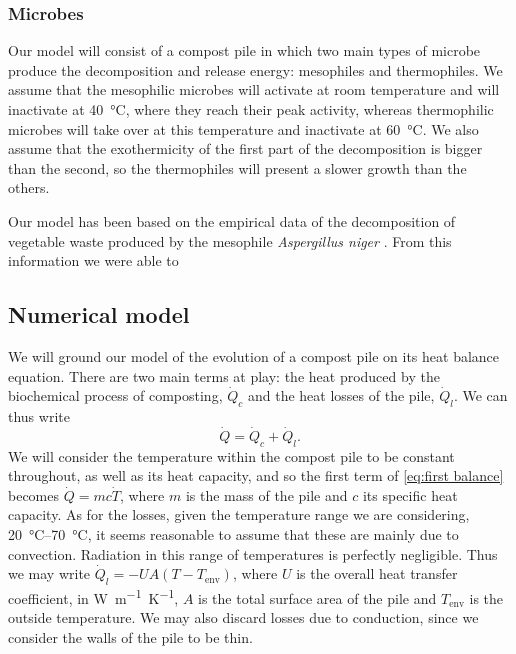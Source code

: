 \documentclass[12pt, a4paper, twocolumn, twoside]{article}
\numberwithin{table}{section}
\numberwithin{figure}{section}
\numberwithin{equation}{section}
\begin{document}
\subsubsection{Microbes}

Our model will consist of a compost pile in which two main types of microbe produce the decomposition and release energy: mesophiles and thermophiles. We assume that the mesophilic microbes will activate at room temperature and will inactivate at \SI{40}{\celsius}, where they reach their peak activity, whereas thermophilic microbes will take over at this temperature and inactivate at \SI{60}{\celsius}. We also assume that the exothermicity of the first part of the decomposition is bigger than the second, so the thermophiles will present a slower growth than the others.

Our model has been based on the empirical data of the decomposition of vegetable waste produced by the mesophile \textit{Aspergillus niger} \cite{saucedo}. From this information we were able to 

\subsection{Numerical model}
We will ground our model of the evolution of a compost pile on its heat balance equation. There are two main terms at play: the heat produced by the biochemical process of composting, \( \dot{Q}_c \) and the heat losses of the pile, \( \dot{Q}_l \). We can thus write
\begin{equation} \label{eq:first balance}
	\dot{Q} = \dot{Q}_c + \dot{Q}_l. 
\end{equation}
We will consider the temperature within the compost pile to be constant throughout, as well as its heat capacity, and so the first term of \cref{eq:first balance} becomes \( \dot{Q} = mc\dot{T} \), where \( m \) is the mass of the pile and \( c \) its specific heat capacity. As for the losses, given the temperature range we are considering, \SIrange{20}{70}{\celsius}, it seems reasonable to assume that these are mainly due to convection. Radiation in this range of temperatures is perfectly negligible. Thus we may write \( \dot{Q}_l = -UA\left(T - T_\text{env}\right) \), where \( U \) is the overall heat transfer coefficient, in \si{W.m^{-1}.K^{-1}}, \( A \) is the total surface area of the pile and \( T_\text{env} \) is the outside temperature. We may also discard losses due to conduction, since we consider the walls of the pile to be thin.
\end{document}
